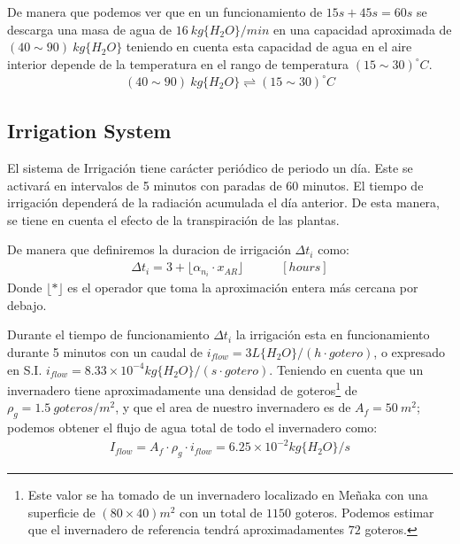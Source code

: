 \documentclass{article}
\begin{document}
De manera que podemos ver que en un funcionamiento de $15s+45s=60s$ se descarga una masa de agua de $16 \  kg \{H_2O\}/min$ en una capacidad aproximada de $(40 \sim 90) \ kg \{H_2O\}$ teniendo en cuenta esta capacidad de agua en el aire interior depende de la temperatura en el rango de temperatura $(15 \sim 30)^\circ C$.
\begin{gather}
    (40 \sim 90) \ kg \{H_2O\} \rightleftharpoons (15 \sim 30)^\circ C
\end{gather}



\subsection{Irrigation System }	

El sistema de Irrigación tiene carácter periódico de periodo  un día. Este se activará en intervalos de 5 minutos con paradas de 60 minutos. El tiempo de irrigación dependerá de la radiación acumulada el día anterior. De esta manera, se tiene en cuenta el efecto de la transpiración de las plantas.  
\newline

De manera que definiremos la duracion de irrigación $\Delta t_i$ como:
\begin{gather}
        \Delta t_i = 3 + \lfloor \alpha_{n_i} \cdot x_{AR}\rfloor \hspace{3em} [hours]
\end{gather}
Donde $\lfloor * \rfloor $ es el operador que toma la aproximación entera más cercana por debajo. 
\newline 

Durante el tiempo de funcionamiento $\Delta t_i$ la irrigación esta en funcionamiento durante 5 minutos con un caudal de $i_{flow} = 3L\{H_2O\}/(h\cdot gotero)$, o expresado en S.I. $i_{flow} = 8.33\times 10^{-4} kg\{H_2O\}/(s\cdot gotero)$. 
%
Teniendo en cuenta que un invernadero tiene aproximadamente una densidad de goteros\footnote{Este valor se ha tomado de un invernadero localizado en Meñaka con una superficie de $(80\times40)m^2$ con un total de $1150$ goteros. Podemos estimar que el invernadero de referencia tendrá aproximadamentes $72$ goteros.} de $\rho_g = 1.5 \ goteros/m^2$, y que el area de nuestro invernadero es de $A_f = 50 \ m^2$; podemos obtener el flujo de agua total de todo el invernadero como:
\begin{gather}
    I_{flow}=A_f\cdot\rho_g\cdot i_{flow} = 6.25 \times 10^{-2} kg\{H_2O\}/s
\end{gather} 
\end{document}
